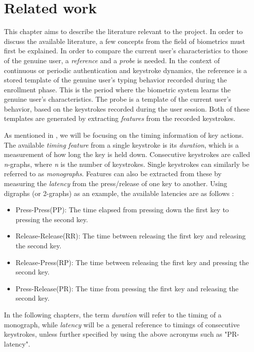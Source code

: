 \chapter{Related work}
\label{chap:related}
This chapter aims to describe the literature relevant to the project.
In order to discuss the available literature, a few concepts from the field of biometrics must first be explained.
In order to compare the current user's characteristics to those of the genuine user, a \textit{reference} and a \textit{probe} is needed.
In the context of continuous or periodic authentication and keystroke dynamics, the reference is a stored template of the genuine user's typing behavior recorded during the enrollment phase. 
This is the period where the biometric system learns the genuine user's characteristics.
The probe is a template of the current user's behavior, based on the keystrokes recorded during the user session.
Both of these templates are generated by extracting \textit{features} from the recorded keystrokes.

As mentioned in , we will be focusing on the timing information of key actions.
The available \textit{timing feature} from a single keystroke is its \textit{duration}, which is a measurement of how long the key is held down.
Consecutive keystrokes are called \textit{n}-graphs, where \textit{n} is the number of keystrokes.
Single keystrokes can similarly be referred to as \textit{monographs}.
Features can also be extracted from these by measuring the \textit{latency} from the press/release of one key to another.
Using digraphs (or 2-graphs) as an example, the available latencies are as follows \cite{mondal}:
\begin{itemize}
    \item Press-Press(PP): The time elapsed from pressing down the first key to pressing the second key.
    \item Release-Release(RR): The time between releasing the first key and releasing the second key.
    \item Release-Press(RP): The time between releasing the first key and pressing the second key.
    \item Press-Release(PR): The time from pressing the first key and releasing the second key.
\end{itemize}
In the following chapters, the term \textit{duration} will refer to the timing of a monograph, while \textit{latency} will be a general reference to timings of consecutive keystrokes, unless further specified by using the above acronyms such as "PR-latency".

